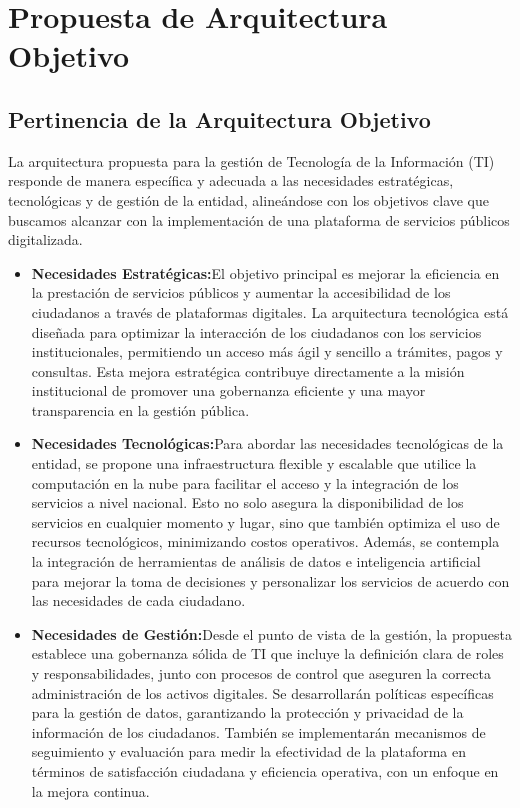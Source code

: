 \section{Propuesta de Arquitectura Objetivo }
\subsection{Pertinencia de la Arquitectura Objetivo }
La arquitectura propuesta para la gestión de Tecnología de la Información (TI) responde de manera específica y adecuada a las necesidades estratégicas, tecnológicas y de gestión de la entidad, alineándose con los objetivos clave que buscamos alcanzar con la implementación de una plataforma de servicios públicos digitalizada.
\begin{itemize}
    \item \textbf{Necesidades Estratégicas:}El objetivo principal es mejorar la eficiencia en la prestación de servicios públicos y aumentar la accesibilidad de los ciudadanos a través de plataformas digitales. La arquitectura tecnológica está diseñada para optimizar la interacción de los ciudadanos con los servicios institucionales, permitiendo un acceso más ágil y sencillo a trámites, pagos y consultas. Esta mejora estratégica contribuye directamente a la misión institucional de promover una gobernanza eficiente y una mayor transparencia en la gestión pública.
    \item \textbf{Necesidades Tecnológicas:}Para abordar las necesidades tecnológicas de la entidad, se propone una infraestructura flexible y escalable que utilice la computación en la nube para facilitar el acceso y la integración de los servicios a nivel nacional. Esto no solo asegura la disponibilidad de los servicios en cualquier momento y lugar, sino que también optimiza el uso de recursos tecnológicos, minimizando costos operativos. Además, se contempla la integración de herramientas de análisis de datos e inteligencia artificial para mejorar la toma de decisiones y personalizar los servicios de acuerdo con las necesidades de cada ciudadano.
    \item \textbf{Necesidades de Gestión:}Desde el punto de vista de la gestión, la propuesta establece una gobernanza sólida de TI que incluye la definición clara de roles y responsabilidades, junto con procesos de control que aseguren la correcta administración de los activos digitales. Se desarrollarán políticas específicas para la gestión de datos, garantizando la protección y privacidad de la información de los ciudadanos. También se implementarán mecanismos de seguimiento y evaluación para medir la efectividad de la plataforma en términos de satisfacción ciudadana y eficiencia operativa, con un enfoque en la mejora continua.
\end{itemize}


